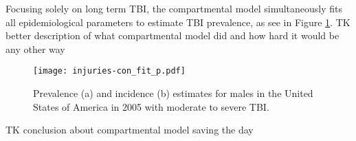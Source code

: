 Focusing solely on long term TBI, the compartmental model simultaneously fits all epidemiological parameters to estimate TBI
prevalence, as see in Figure \ref{fig:app-injury brain fit}.  TK better
description of what compartmental model did and how hard it would be any other way

    \begin{figure}[h]
        \begin{center}
            \texttt{[image: injuries-con\_fit\_p.pdf]}
            \caption{Prevalence (a) and incidence (b)
              estimates for males in the United States of America in
              2005 with moderate to severe TBI.}
            \label{fig:app-injury brain fit}
        \end{center}
    \end{figure}

TK conclusion about compartmental model saving the day

